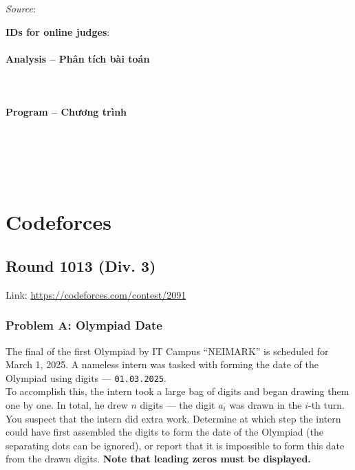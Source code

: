 \documentclass{article}
\begin{document}
\textit{Source}: 

\textbf{IDs for online judges}:

\paragraph{Analysis -- Phân tích bài toán} \mbox{} \\



\paragraph{Program -- Chương trình} \mbox{} \\


\begin{lstlisting}
	
	
\end{lstlisting}



\section{Codeforces}

\subsection{Round 1013 (Div. 3)}

Link: \url{https://codeforces.com/contest/2091}

\subsubsection{Problem A: Olympiad Date}

The final of the first Olympiad by IT Campus ``NEIMARK'' is scheduled for March 1, 2025. A nameless intern was tasked with forming the date of the Olympiad using digits — \texttt{01.03.2025}.\\

To accomplish this, the intern took a large bag of digits and began drawing them one by one. In total, he drew $n$ digits — the digit $a_i$ was drawn in the $i$-th turn.\\

You suspect that the intern did extra work. Determine at which step the intern could have first assembled the digits to form the date of the Olympiad (the separating dots can be ignored), or report that it is impossible to form this date from the drawn digits. \textbf{Note that leading zeros must be displayed.}
\end{document}
